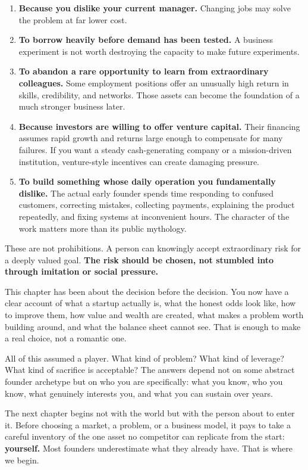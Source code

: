 \begin{enumerate}
  \item \textbf{Because you dislike your current manager.} Changing jobs may solve the problem at far lower cost.
  \item \textbf{To borrow heavily before demand has been tested.} A business experiment is not worth destroying the capacity to make future experiments.
  \item \textbf{To abandon a rare opportunity to learn from extraordinary colleagues.} Some employment positions offer an unusually high return in skills, credibility, and networks. Those assets can become the foundation of a much stronger business later.
  \item \textbf{Because investors are willing to offer venture capital.} Their financing assumes rapid growth and returns large enough to compensate for many failures. If you want a steady cash-generating company or a mission-driven institution, venture-style incentives can create damaging pressure.
  \item \textbf{To build something whose daily operation you fundamentally dislike.} The actual early founder spends time responding to confused customers, correcting mistakes, collecting payments, explaining the product repeatedly, and fixing systems at inconvenient hours. The character of the work matters more than its public mythology.
\end{enumerate}

These are not prohibitions. A person can knowingly accept extraordinary risk for a deeply valued goal. \textbf{The risk should be chosen, not stumbled into through imitation or social pressure.}

\medskip

This chapter has been about the decision before the decision. You now have a clear account of what a startup actually is, what the honest odds look like, how to improve them, how value and wealth are created, what makes a problem worth building around, and what the balance sheet cannot see. That is enough to make a real choice, not a romantic one.

All of this assumed a player. What kind of problem? What kind of leverage? What kind of sacrifice is acceptable? The answers depend not on some abstract founder archetype but on who you are specifically: what you know, who you know, what genuinely interests you, and what you can sustain over years.

The next chapter begins not with the world but with the person about to enter it. Before choosing a market, a problem, or a business model, it pays to take a careful inventory of the one asset no competitor can replicate from the start: \textbf{yourself.} Most founders underestimate what they already have. That is where we begin.


